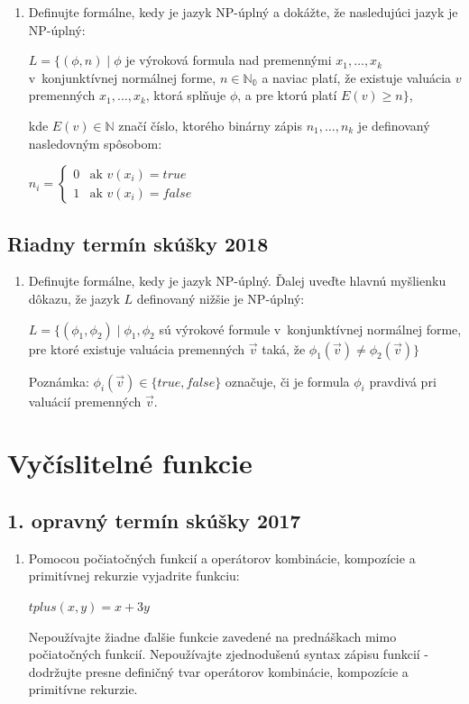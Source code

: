\documentclass[11pt,a4paper]{article}
\begin{document}
		\begin{enumerate}
			\item Definujte formálne, kedy je jazyk NP-úplný a dokážte, že nasledujúci jazyk je NP-úplný:

			$L = \{(\phi, n) \mid \phi$ je výroková formula nad premennými $x_1, \ldots, x_k$ v~konjunktívnej normálnej forme, $n \in \mathbb{N_0}$ a naviac platí, že existuje valuácia $v$ premenných $x_1, \ldots, x_k$, ktorá splňuje $\phi$, a pre ktorú platí $E(v) \geq n\}$,
	
			kde $E(v) \in \mathbb{N}$ značí číslo, ktorého binárny zápis $n_1, \ldots, n_k$ je definovaný nasledovným spôsobom:
	
			$n_i =
			\left\{
			\begin{array}{ll}
				0  & \mbox{ak } v(x_i) = true \\
				1 & \mbox{ak } v(x_i) = false
			\end{array}
			\right.$
		\end{enumerate}	

		\subsection{Riadny termín skúšky 2018}

		\begin{enumerate}
			\item Definujte formálne, kedy je jazyk NP-úplný. Ďalej uveďte hlavnú myšlienku dôkazu, že jazyk $L$ definovaný nižšie je NP-úplný:

			$L = \{(\phi_1, \phi_2) \mid \phi_1, \phi_2$ sú výrokové formule v~konjunktívnej normálnej forme, pre ktoré existuje valuácia premenných $\vec{v}$ taká, že $\phi_1(\vec{v}) \neq \phi_2(\vec{v})\}$
	
			Poznámka: $\phi_i(\vec{v}) \in \{true, false\}$ označuje, či je formula $\phi_i$ pravdivá pri valuácií premenných $\vec{v}$.
		\end{enumerate}

	\section{Vyčíslitelné funkcie}

		\subsection{1. opravný termín skúšky 2017}

		\begin{enumerate}
			\item Pomocou počiatočných funkcií a operátorov kombinácie, kompozície a primitívnej rekurzie vyjadrite funkciu:

			$tplus(x,y) = x + 3y$
	
			Nepoužívajte žiadne ďalšie funkcie zavedené na prednáškach mimo počiatočných funkcií. Nepoužívajte zjednodušenú syntax zápisu funkcií \-- dodržujte presne definičný tvar operátorov kombinácie, kompozície a primitívne rekurzie.
		\end{enumerate}	
\end{document}
